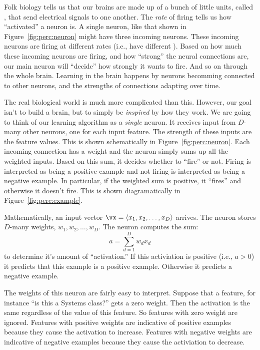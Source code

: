 
Folk biology tells us that our brains are made up of a bunch of little
units, called , that send electrical signals to one
another.  The \emph{rate} of firing tells us how ``activated'' a
neuron is.  A single neuron, like that shown in
Figure~\ref{fig:perc:neuron} might have three incoming neurons.  These
incoming neurons are firing at different rates (i.e., have different
).  Based on how much these incoming neurons are
firing, and how ``strong'' the neural connections are, our main neuron
will ``decide'' how strongly it wants to fire.  And so on through the
whole brain.  Learning in the brain happens by neurons becomming
connected to other neurons, and the strengths of connections adapting
over time.


The real biological world is much more complicated than this.
However, our goal isn't to build a brain, but to simply be
\emph{inspired} by how they work.  We are going to think of our
learning algorithm as a \emph{single} neuron.  It receives input from
$D$-many other neurons, one for each input feature.  The strength of
these inputs are the feature values.  This is shown schematically in
Figure~\ref{fig:perc:neuron}.  Each incoming connection has a weight
and the neuron simply sums up all the weighted inputs.  Based on this
sum, it decides whether to ``fire'' or not.  Firing is interpreted as
being a positive example and not firing is interpreted as being a
negative example.  In particular, if the weighted sum is positive, it
``fires'' and otherwise it doesn't fire.  This is shown
diagramatically in Figure~\ref{fig:perc:example}.

Mathematically, an input vector $\vx = \langle x_1, x_2, \dots, x_D
\rangle$ arrives.  The neuron stores $D$-many weights, $w_1, w_2,
\dots, w_D$.  The neuron computes the sum:
\begin{equation} \label{eq:perc:sum}
a = \sum_{d=1}^D w_d x_d
\end{equation}
to determine it's amount of ``activation.''  If this activiation is
positive (i.e., $a > 0$) it predicts that this example is a positive
example.  Otherwise it predicts a negative example.

The weights of this neuron are fairly easy to interpret.  Suppose that
a feature, for instance ``is this a Systems class?'' gets a zero
weight.  Then the activation is the same regardless of the value of
this feature.  So features with zero weight are ignored.  Features
with positive weights are indicative of positive examples because they
cause the activation to increase.  Features with negative weights are
indicative of negative examples because they cause the activiation to
decrease.

